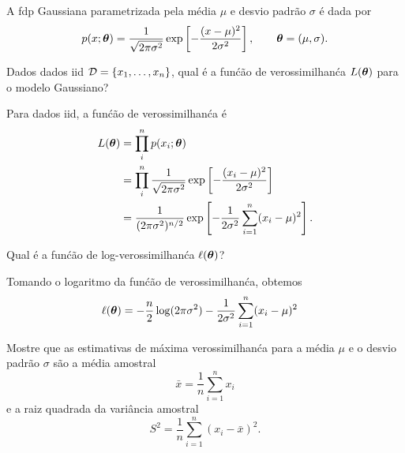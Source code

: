 
\label{ex:Gauss-MLE}

A fdp Gaussiana parametrizada pela m\'edia $\mu$ e desvio padr\~ao $\sigma$ \'e dada por
$$ p(x; \boldsymbol{\theta}) = \frac{1}{\sqrt{2\pi\sigma^2}}\exp\left[-\frac{(x-\mu)^2}{2\sigma^2}\right], \quad \quad \boldsymbol{\theta} = (\mu, \sigma).$$

\begin{exenumerate}
    
    \item Dados dados iid $\mathcal{D} = \{x_1, \ldots, x_n\}$, qual \'e a fun\'c\~ao de verossimilhan\'ca $L(\boldsymbol{\theta})$ para o modelo Gaussiano?
    
    \begin{solution}
        Para dados iid, a fun\'c\~ao de verossimilhan\'ca \'e
        \begin{align}
            L(\boldsymbol{\theta}) &= \prod_i^n p(x_i;\boldsymbol{\theta}) \\
            &= \prod_i^n \frac{1}{\sqrt{2\pi\sigma^2}}\exp\left[-\frac{(x_i-\mu)^2}{2\sigma^2}\right]\\
            &= \frac{1}{(2\pi\sigma^2)^{n/2}}\exp\left[-\frac{1}{2\sigma^2}\sum_{i=1}^n (x_i-\mu)^2\right].
        \end{align}
        
    \end{solution}
    
    \item Qual \'e a fun\'c\~ao de log-verossimilhan\'ca $\ell(\boldsymbol{\theta})$?
    
    \begin{solution}
        
        Tomando o logaritmo da fun\'c\~ao de verossimilhan\'ca, obtemos
        \begin{align}
            \ell(\boldsymbol{\theta}) & = -\frac{n}{2} \log(2\pi \sigma^2) -\frac{1}{2\sigma^2} \sum_{i=1}^n (x_i-\mu)^2
        \end{align}
        
    \end{solution}
    
    \item Mostre que as estimativas de m\'axima verossimilhan\'ca para a m\'edia $\mu$ e o desvio padr\~ao $\sigma$ s\~ao a m\'edia amostral 
    \begin{equation}
        \bar{x}= \frac{1}{n} \sum_{i=1}^n x_i
    \end{equation}
    e a raiz quadrada da vari\^ancia amostral
    \begin{equation}
        S^2 = \frac{1}{n} \sum_{i=1}^n (x_i -\bar{x})^2.
    \end{equation}
    

\end{exenumerate}
